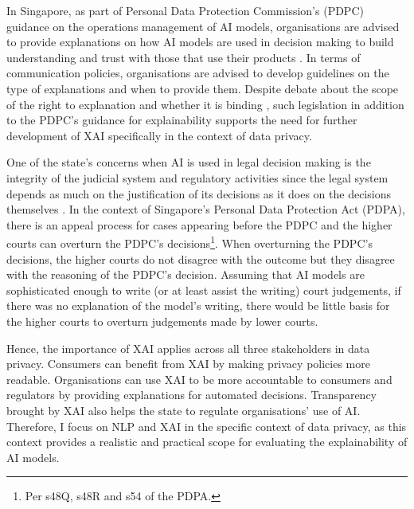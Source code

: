 \documentclass[11pt]{article}
\begin{document}
In Singapore, as part of Personal Data Protection Commission's (PDPC) guidance on the operations management of AI models, organisations are advised to provide explanations on how AI models are used in decision making to build understanding and trust with those that use their products \cite{ai_modelframework}. In terms of communication policies, organisations are advised to develop guidelines on the type of explanations and when to provide them. Despite debate about the scope of the right to explanation and whether it is binding \cite{chesterman2021_transparency}, such legislation in addition to the PDPC's guidance for explainability supports the need for further development of XAI specifically in the context of data privacy. 

One of the state's concerns when AI is used in legal decision making is the integrity of the judicial system and regulatory activities since the legal system depends as much on the justification of its decisions as it does on the decisions themselves \cite{chesterman2021_opacity}. In the context of Singapore's Personal Data Protection Act (PDPA), there is an appeal process for cases appearing before the PDPC and the higher courts can overturn the PDPC's decisions\footnote{Per s48Q, s48R and s54 of the PDPA.}. When overturning the PDPC's decisions, the higher courts do not disagree with the outcome but they disagree with the reasoning of the PDPC's decision. Assuming that AI models are sophisticated enough to write (or at least assist the writing) court judgements, if there was no explanation of the model's writing, there would be little basis for the higher courts to overturn judgements made by lower courts. 

Hence, the importance of XAI applies across all three stakeholders in data privacy. Consumers can benefit from XAI by making privacy policies more readable. Organisations can use XAI to be more accountable to consumers and regulators by providing explanations for automated decisions. Transparency brought by XAI also helps the state to regulate organisations' use of AI. Therefore, I focus on NLP and XAI in the specific context of data privacy, as this context provides a realistic and practical scope for evaluating the explainability of AI models.
\end{document}
